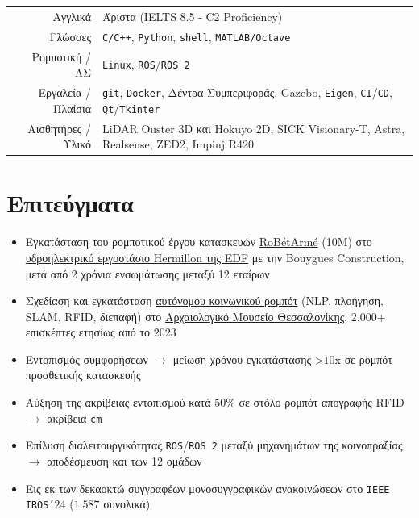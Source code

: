 \documentclass[a4paper,10pt,twoside]{article}
\begin{document}
\begin{center}
\begin{tabular}{rl}
Αγγλικά & Άριστα (IELTS 8.5 - C2 Proficiency) \\
Γλώσσες & \texttt{C/C++}, \texttt{Python}, \texttt{shell}, \texttt{MATLAB/Octave} \\
Ρομποτική / ΛΣ & \texttt{Linux},  \texttt{ROS}/\texttt{ROS 2} \\
Εργαλεία / Πλαίσια & \texttt{git}, \texttt{Docker}, Δέντρα Συμπεριφοράς, Gazebo, \texttt{Eigen}, \texttt{CI}/\texttt{CD}, \texttt{Qt}/\texttt{Tkinter} \\
Αισθητήρες / Υλικό & {\small LiDAR Ouster 3D και Hokuyo 2D, SICK Visionary-T, Astra, Realsense, ZED2, Impinj R420 }%
\end{tabular}
\end{center}
\verticalspacebetweensections

\section{\textbf{Επιτεύγματα}}\verticalspacebetweensectionandcontent
  \noindent\begin{minipage}[t]{\textwidth}
    \begin{itemize}
      \item Εγκατάσταση του ρομποτικού έργου κατασκευών \href{https://www.robetarme-project.eu/sobre/}{RoBétArmé} (\texteuro10Μ) στο \href{https://www.gem.wiki/Hermillon_hydroelectric_plant}{υδροηλεκτρικό εργοστάσιο Hermillon της EDF} με την Bouygues Construction, μετά από 2 χρόνια ενσωμάτωσης μεταξύ 12 εταίρων\verticalspaceafteritem
      \item Σχεδίαση και εγκατάσταση \href{https://www.youtube.com/watch?v=2EvTGNOqTrs}{αυτόνομου κοινωνικού ρομπότ} (NLP, πλοήγηση, SLAM, RFID, διεπαφή) στο \href{https://www.amth.gr/}{Αρχαιολογικό Μουσείο Θεσσαλονίκης}, $2$$.$$000$+ επισκέπτες ετησίως από το $2023$\verticalspaceafteritem
      \item Εντοπισμός συμφορήσεων $\rightarrow$ μείωση χρόνου εγκατάστασης >$10$x σε ρομπότ προσθετικής κατασκευής\verticalspaceafteritem
      \item Αύξηση της ακρίβειας εντοπισμού κατά $50\%$ σε στόλο ρομπότ απογραφής RFID $\rightarrow$ ακρίβεια \texttt{cm}\verticalspaceafteritem
      \item Επίλυση διαλειτουργικότητας \texttt{ROS}/\texttt{ROS~2} μεταξύ μηχανημάτων της κοινοπραξίας $\rightarrow$ αποδέσμευση και των 12 ομάδων\verticalspaceafteritem
      \item Εις εκ των δεκαοκτώ συγγραφέων μονοσυγγραφικών ανακοινώσεων στο \texttt{IEEE IROS'}$24$ ($1$$.$$587$ συνολικά)
    \end{itemize}
  \end{minipage} \\%
\verticalspacebetweensections
\end{document}
